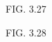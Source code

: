 \documentclass[3p,times,number,review]{elsarticle}
\newcommand{\figref}[1]{\figurename~\ref{#1}}
\begin{document}
FIG. 3.27

FIG. 3.28

\end{document}
